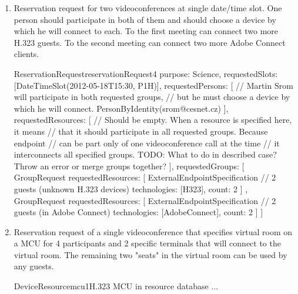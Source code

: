 \begin{enumerate}
\begin{EntityExample}{ReservationRequest}{reservationRequest3}{}
purpose: Science,
requestedSlots: [DateTimeSlot(2012-05-18T15:30, P1H)],
requestedPersons: [
  PersonByIdentity(srom@cesnet.cz),  // Martin Srom (must choose a device)
  PersonByIdentity(hopet@cesnet.cz), // Petr Holub (must choose a device)
  Person { // Jan Ruzicka (must choose a device)
    name: Jan Ruzicka,
    email: janru@cesnet.cz
  }
]
\end{EntityExample}

\item Reservation request for two videoconferences at single date/time slot. One person should participate in both of them and should choose a device by which he will connect to each. To the first meeting can connect two more H.323 guests. To the second meeting can connect two more Adobe Connect clients.

\begin{EntityExample}{ReservationRequest}{reservationRequest4}{}
purpose: Science,
requestedSlots: [DateTimeSlot(2012-05-18T15:30, P1H)],
requestedPersons: [
  // Martin Srom will participate in both requested groups,
  // but he must choose a device by which he will connect.
  PersonByIdentity(srom@cesnet.cz)
],
requestedResources: [
  // Should be empty. When a resource is specified here, it means
  // that it should participate in all requested groups. Because endpoint
  // can be part only of one videoconference call at the time
  // it interconnects all specified groups.
  TODO: What to do in described case? Throw an error or merge groups together?
],
requestedGroups: [
  GroupRequest {
    requestedResources: [
      ExternalEndpointSpecification { // 2 guests (unknown H.323 devices)
        technologies: [H323],
        count: 2
      }
    ]
  },
  GroupRequest {
    requestedResources: [
      ExternalEndpointSpecification { // 2 guests (in Adobe Connect)
        technologies: [AdobeConnect],
        count: 2
      }
    ]
  }
]
\end{EntityExample}

\item Reservation request of a single videoconference that specifies virtual room on a MCU for 4 participants and 2 specific terminals that will connect to the virtual room. The remaining two "seats" in the virtual room can be used by any guests.

\begin{EntityExample}{DeviceResource}{mcu1}{H.323 MCU in resource database}
...
\end{EntityExample}


\end{enumerate}
